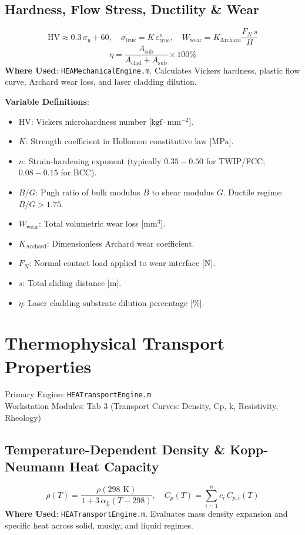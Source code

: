 \documentclass[11pt,a4paper]{article}
\begin{document}
\subsection{Hardness, Flow Stress, Ductility \& Wear}
\begin{equation}
\text{HV} \approx 0.3 \, \sigma_y + 60, \quad \sigma_{\text{true}} = K \, \varepsilon_{\text{true}}^n, \quad W_{\text{wear}} = K_{\text{Archard}} \frac{F_N \, s}{H}
\end{equation}
\begin{equation}
\eta = \frac{A_{\text{sub}}}{A_{\text{clad}} + A_{\text{sub}}} \times 100\%
\end{equation}
\textbf{Where Used}: \texttt{HEAMechanicalEngine.m}. Calculates Vickers hardness, plastic flow curve, Archard wear loss, and laser cladding dilution.

\noindent\textbf{Variable Definitions}:
\begin{itemize}
  \item $\text{HV}$: Vickers microhardness number [$\text{kgf}\cdot\text{mm}^{-2}$].
  \item $K$: Strength coefficient in Hollomon constitutive law [$\text{MPa}$].
  \item $n$: Strain-hardening exponent (typically $0.35 - 0.50$ for TWIP/FCC; $0.08 - 0.15$ for BCC).
  \item $B/G$: Pugh ratio of bulk modulus $B$ to shear modulus $G$. Ductile regime: $B/G > 1.75$.
  \item $W_{\text{wear}}$: Total volumetric wear loss [$\text{mm}^3$].
  \item $K_{\text{Archard}}$: Dimensionless Archard wear coefficient.
  \item $F_N$: Normal contact load applied to wear interface [$\text{N}$].
  \item $s$: Total sliding distance [$\text{m}$].
  \item $\eta$: Laser cladding substrate dilution percentage [$\%$].
\end{itemize}

\section{Thermophysical Transport Properties}
Primary Engine: \texttt{HEATransportEngine.m} \\
Workstation Modules: Tab 3 (Transport Curves: Density, Cp, k, Resistivity, Rheology)

\subsection{Temperature-Dependent Density \& Kopp-Neumann Heat Capacity}
\begin{equation}
\rho(T) = \frac{\rho(298\text{ K})}{1 + 3 \, \alpha_L (T - 298)}, \quad C_p(T) = \sum_{i=1}^n c_i \, C_{p, i}(T)
\end{equation}
\textbf{Where Used}: \texttt{HEATransportEngine.m}. Evaluates mass density expansion and specific heat across solid, mushy, and liquid regimes.
\end{document}
